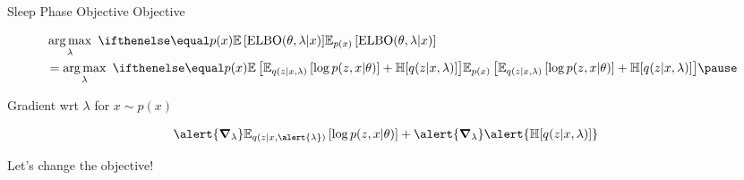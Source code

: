 \begin{frame}{Sleep Phase Objective}
Objective  %

\vspace{-15pt}

\begin{equation*}
\begin{aligned}
&\argmax_{\lambda}~ \E[p(x)]{\ELBO(\theta, \lambda|x)} \\
&=\argmax_{\lambda}~ \E[p(x)]{\mathbb E_{q(z|x, \lambda)}\left[ \log p(z, x| \theta) \right] + \mathbb H[q(z|x, \lambda)] } \pause
\end{aligned}
\end{equation*}

Gradient wrt $\lambda$ for $x \sim p(x)$

\vspace{-10pt}
\begin{equation*}
\begin{aligned}
&\alert{\grad_\lambda} \mathbb E_{q(z|x, \alert{\lambda})}\left[ \log p(z, x| \theta) \right] + \alert{\grad_\lambda} \alert{\mathbb H[q(z|x, \lambda)]} 
\end{aligned}
\end{equation*} 

\pause

\alert{Let's change the objective!}

\end{frame}


